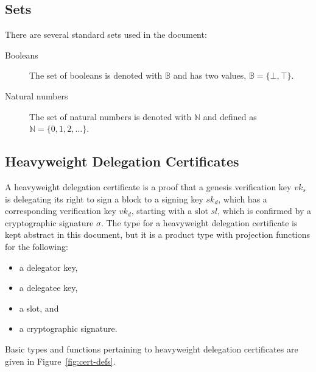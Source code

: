 \documentclass[11pt,a4paper]{article}
\begin{document}
\subsection{Sets}
\label{sec:sets}

There are several standard sets used in the document:
%
\begin{description}
\item[Booleans] The set of booleans is denoted with $\mathbb{B}$ and has two
  values, $\mathbb{B} = \{\bot, \top\}$.
\item[Natural numbers] The set of natural numbers is denoted with
  $\mathbb{N}$ and defined as $\mathbb{N} = \{0, 1, 2, \dots\}$.
\end{description}

\subsection{Heavyweight Delegation Certificates}
\label{sec:certificates}

A heavyweight delegation certificate is a proof that a genesis verification key
$vk_s$ is delegating its right to sign a block to a signing key $sk_d$, which
has a corresponding verification key $vk_d$, starting with a slot $sl$, which is
confirmed by a cryptographic signature $\sigma$.
%
The type for a heavyweight delegation certificate is kept abstract in this
document, but it is a product type with projection functions for the
following:
%
\begin{itemize}
\item a delegator key,
\item a delegatee key,
\item a slot, and
\item a cryptographic signature.
\end{itemize}

Basic types and functions pertaining to heavyweight delegation certificates
are given in Figure~\ref{fig:cert-defs}.
\end{document}
